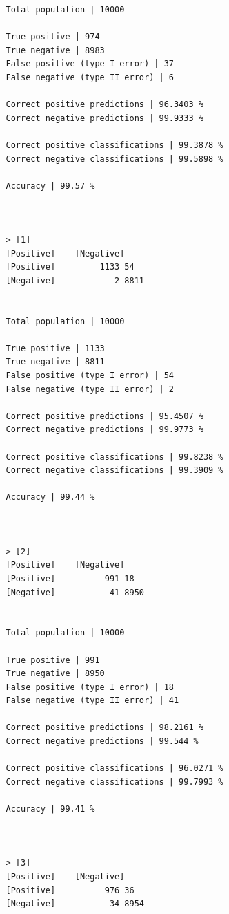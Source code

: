 \documentclass{classrep}
\begin{document}
{{{\begin{lstlisting}
                Total population | 10000

                True positive | 974
                True negative | 8983
                False positive (type I error) | 37
                False negative (type II error) | 6

                Correct positive predictions | 96.3403 %
                Correct negative predictions | 99.9333 %

                Correct positive classifications | 99.3878 %
                Correct negative classifications | 99.5898 %

                Accuracy | 99.57 %



                > [1]
                [Positive]    [Negative]
                [Positive]         1133 54
                [Negative]            2 8811


                Total population | 10000

                True positive | 1133
                True negative | 8811
                False positive (type I error) | 54
                False negative (type II error) | 2

                Correct positive predictions | 95.4507 %
                Correct negative predictions | 99.9773 %

                Correct positive classifications | 99.8238 %
                Correct negative classifications | 99.3909 %

                Accuracy | 99.44 %



                > [2]
                [Positive]    [Negative]
                [Positive]          991 18
                [Negative]           41 8950


                Total population | 10000

                True positive | 991
                True negative | 8950
                False positive (type I error) | 18
                False negative (type II error) | 41

                Correct positive predictions | 98.2161 %
                Correct negative predictions | 99.544 %

                Correct positive classifications | 96.0271 %
                Correct negative classifications | 99.7993 %

                Accuracy | 99.41 %



                > [3]
                [Positive]    [Negative]
                [Positive]          976 36
                [Negative]           34 8954



\end{lstlisting}}}}
\end{document}
